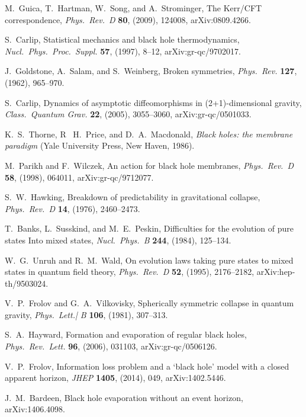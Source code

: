 \documentclass[11pt]{article}
\begin{document}
\begin{thebibliography}{999}
 M.\ Guica, T.\ Hartman, W.\ Song, and A.\ Strominger,
The Kerr/CFT correspondence, \emph{Phys.\ Rev.\ D} {\bf 80}, 
(2009), 124008, arXiv:0809.4266. 

 S.\ Carlip, Statistical mechanics and 
black hole thermodynamics, \emph{Nucl.\ Phys.\ Proc.\ Suppl.}
{\bf 57}, (1997), 8--12, arXiv:gr-qc/9702017.

  J.\ Goldstone, A.\ Salam, and S.\ Weinberg, 
Broken symmetries, \emph{Phys.\ Rev.} {\bf 127}, (1962), 965--970.

 S.\ Carlip, Dynamics of asymptotic diffeomorphisms 
in (2+1)-dimensional gravity, \emph{Class.\ Quantum Grav.} {\bf 22},
(2005), 3055--3060, arXiv:gr-qc/0501033.

  K.~S.\ Thorne, R~ H.\ Price, and D.~A.\ Macdonald,
\emph{Black holes: the membrane paradigm} (Yale University Press, 
New Haven, 1986).

 M.\ Parikh and F.\ Wilczek, An action for black hole 
membranes, \emph{Phys.\ Rev.\ D} {\bf 58}, (1998), 064011,
arXiv:gr-qc/9712077.

 S.~W.\ Hawking, Breakdown of predictability 
in gravitational collapse, \emph{Phys.\ Rev.\ D} {\bf 14}, (1976),
2460--2473.

 T.\ Banks, L.\ Susskind, and M.~E.\ Peskin, 
Difficulties for the evolution of pure states Into mixed states,
\emph{Nucl.\ Phys.\ B} {\bf 244}, (1984), 125--134.

 W.~G.\ Unruh and R.~M.\ Wald, On evolution 
laws taking pure states to mixed states in quantum field theory,
\emph{Phys.\ Rev.\ D} {\bf 52},  (1995), 2176--2182, 
arXiv:hep-th/9503024.

 V.~P.\ Frolov and G.~A.\ Vilkovisky,
Spherically symmetric collapse in quantum gravity,
\emph{Phys.\ Lett.| B} {\bf 106}, (1981), 307--313.

 S.~A.\ Hayward, Formation and evaporation 
of regular black holes, \emph{Phys.\ Rev.\ Lett.} {\bf 96}, (2006), 
031103, arXiv:gr-qc/0506126.

 V.~P.\ Frolov, Information loss problem and 
a `black hole' model with a closed apparent horizon, 
\emph{JHEP} {\bf 1405}, (2014), 049, arXiv:1402.5446.

  J.~M.\ Bardeen, Black hole evaporation 
without an event horizon,  arXiv:1406.4098.


\end{thebibliography}
\end{document}
